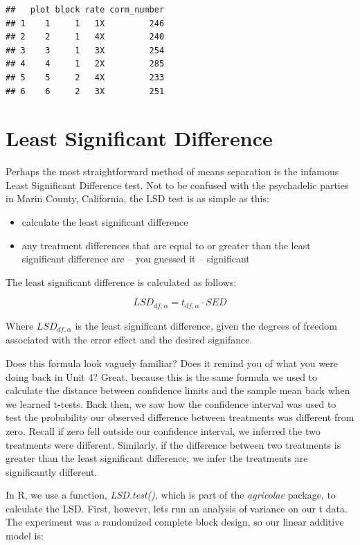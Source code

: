 \documentclass[
]{book}
\providecommand{\tightlist}{%
  \setlength{\itemsep}{0pt}\setlength{\parskip}{0pt}}
\begin{document}
\begin{verbatim}
##   plot block rate corm_number
## 1    1     1   1X         246
## 2    2     1   4X         240
## 3    3     1   3X         254
## 4    4     1   2X         285
## 5    5     2   4X         233
## 6    6     2   3X         251
\end{verbatim}

\hypertarget{least-significant-difference}{%
\section{Least Significant Difference}\label{least-significant-difference}}

Perhaps the most straightforward method of means separation is the infamous Least Significant Difference test. Not to be confused with the psychadelic parties in Marin County, California, the LSD test is as simple as this:

\begin{itemize}
\tightlist
\item
  calculate the least significant difference
\item
  any treatment differences that are equal to or greater than the least significant difference are -- you guessed it -- significant
\end{itemize}

The least significant difference is calculated as follows:

\[LSD_{df, \alpha} = t_{df, \alpha} \cdot SED\]

Where \(LSD_{df, \alpha}\) is the least significant difference, given the degrees of freedom associated with the error effect and the desired signifance.

Does this formula look vaguely familiar? Does it remind you of what you were doing back in Unit 4? Great, because this is the same formula we used to calculate the distance between confidence limits and the sample mean back when we learned t-tests. Back then, we saw how the confidence interval was used to test the probability our observed difference between treatments was different from zero. Recall if zero fell outside our confidence interval, we inferred the two treatments were different. Similarly, if the difference between two treatments is greater than the least significant difference, we infer the treatments are significantly different.

In R, we use a function, \emph{LSD.test()}, which is part of the \emph{agricolae} package, to calculate the LSD. First, however, lets run an analysis of variance on our t
data. The experiment was a randomized complete block design, so our linear additive model is:
\end{document}

